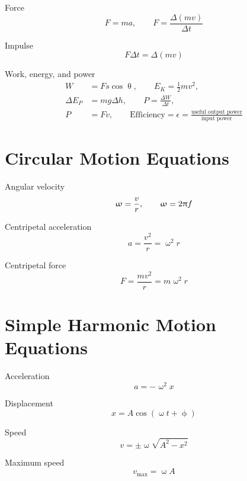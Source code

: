 Force
\begin{equation*}
F=ma, \qquad F=\frac{\Delta\left(mv\right)}{\Delta t}
\end{equation*}

Impulse
\begin{equation*}
F\Delta t =\Delta \left(mv\right)
\end{equation*}

Work, energy, and power
\begin{align*}
W&=Fs\cos\uptheta, \qquad  E_{K}=\frac{1}{2}mv^{2},\\
\Delta E_{P}&=mg\Delta h, \qquad P=\frac{\Delta W}{\Delta t},\\
P&=Fv, \qquad \text{Efficiency}=\epsilon =\frac{\text{useful output power}}{\text{input power}}
\end{align*}

\section*{Circular Motion Equations}

Angular velocity 
\begin{equation*}
\upomega=\frac{v}{r}, \qquad \upomega=2\uppi f
\end{equation*}

Centripetal acceleration
\begin{equation*}
a=\frac{v^{2}}{r}=\upomega^{2}r
\end{equation*}

Centripetal force
\begin{equation*}
F=\frac{mv^{2}}{r}=m\upomega^{2}r
\end{equation*}

\section*{Simple Harmonic Motion Equations}

Acceleration
\begin{equation*}
a=-\upomega^{2}x
\end{equation*}

Displacement
\begin{equation*}
x=A\cos\left(\upomega t+\upphi\right)
\end{equation*}

Speed
\begin{equation*}
v=\pm \upomega \sqrt{A^{2}-x^{2}}
\end{equation*}

Maximum speed
\begin{equation*}
v_{\text{max}}=\upomega A
\end{equation*}

